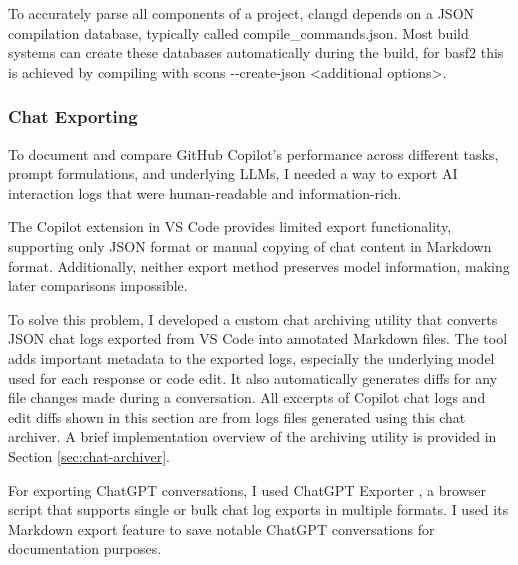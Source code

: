 To accurately parse all components of a project, clangd depends on a JSON compilation database, typically called compile\_commands.json. Most build systems can create these databases automatically during the build, for basf2 this is achieved by compiling with scons \mbox{{-}{-}create-json} <additional options>.

\subsubsection{Chat Exporting}
To document and compare GitHub Copilot's performance across different tasks, prompt formulations, and underlying LLMs, I needed a way to export AI interaction logs that were human-readable and information-rich.

The Copilot extension in VS Code provides limited export functionality, supporting only JSON format or manual copying of chat content in Markdown format.
Additionally, neither export method preserves model information, making later comparisons impossible.

To solve this problem, I developed a custom chat archiving utility that converts JSON chat logs exported from VS Code into annotated Markdown files.
The tool adds important metadata to the exported logs, especially the underlying model used for each response or code edit.
It also automatically generates diffs for any file changes made during a conversation.
All excerpts of Copilot chat logs and edit diffs shown in this section are from logs files generated using this chat archiver.
A brief implementation overview of the archiving utility is provided in Section \ref{sec:chat-archiver}.

For exporting ChatGPT conversations, I used ChatGPT Exporter \cite{chatgpt-exporter}, a browser script that supports single or bulk chat log exports in multiple formats.
I used its Markdown export feature to save notable ChatGPT conversations for documentation purposes.
